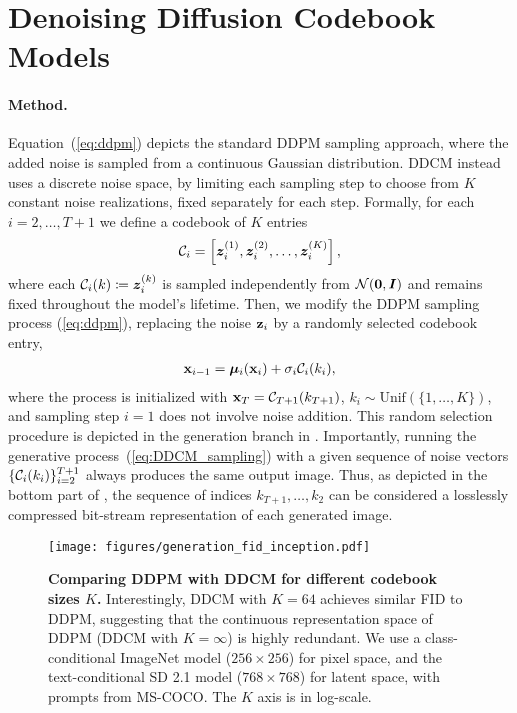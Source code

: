


\section{Denoising Diffusion Codebook Models}\label{sec:method}
\paragraph{Method.}Equation~(\ref{eq:ddpm}) depicts the standard DDPM sampling approach, where the added noise is sampled from a continuous Gaussian distribution.
DDCM instead uses a discrete noise space, by limiting each sampling step to choose from $K$ constant noise realizations, fixed separately for each step.
Formally, for each $i=2,\ldots,T+1$ we define a codebook of $K$ entries
\begin{align}
   {\mathcal{C}}_i = \left[{\bm{z}}_i^{(1)},{\bm{z}}_i^{(2)}, \ldots, {\bm{z}}_i^{(K)}\right],
\end{align}
where each ${\mathcal{C}}_{i}(k)\coloneqq{\bm{z}}_{i}^{(k)}$ is sampled independently from $\mathcal{N}({\bm{0}},{\bm{I}})$ and remains fixed throughout the model's lifetime.
Then, we modify the DDPM sampling process (\ref{eq:ddpm}), replacing the noise ${\mathbf{z}}_{i}$ by a randomly selected codebook entry,
\vspace{-0.19em}
\begin{align}\label{eq:DDCM_sampling}
    {\mathbf{x}}_{i-1} = {\bm{\mu}}_i({\mathbf{x}}_i) + \sigma_i {\mathcal{C}}_i(k_i),
\end{align}
where the process is initialized with ${\mathbf{x}}_{T}={\mathcal{C}}_{T+1}(k_{T+1})$, $k_i\sim\text{Unif}(\{1, \ldots, K\})$, and sampling step $i=1$ does not involve noise addition. This random selection procedure is depicted in the generation branch in .
Importantly, running the generative process~(\ref{eq:DDCM_sampling}) with a given sequence of noise vectors $\{{\mathcal{C}}_{i}(k_i)\}_{i=2}^{T+1}$ always produces the same output image.
Thus, as depicted in the bottom part of , the sequence of indices $k_{T+1},\hdots,k_2$ can be considered a losslessly compressed bit-stream representation of each generated image. 

\begin{figure}[t]
    \centering
    \texttt{[image: figures/generation\_fid\_inception.pdf]}\vspace{-0.3cm}
    \caption{\textbf{Comparing DDPM with DDCM for different codebook sizes $K$.}
    Interestingly, DDCM with $K=64$ achieves similar FID to DDPM, suggesting that the continuous representation space of DDPM (DDCM with $K=\infty$) is highly redundant.
    We use a class-conditional ImageNet model ($256\times256$) for pixel space, and the text-conditional SD 2.1 model ($768\times768$) for latent space, with prompts from MS-COCO.
    The $K$ axis is in log-scale.
}    
    \label{fig:generation_fid_inception_comparison}
\end{figure}
